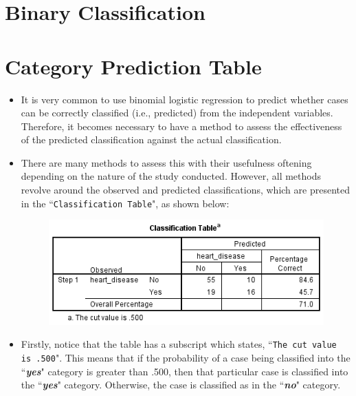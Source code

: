 \documentclass[a4paper,12pt]{article}
\begin{document}
	
\section*{Binary Classification}	





\section*{Category Prediction Table}

\begin{itemize}
	\item It is very common to use binomial logistic regression to predict whether cases can be correctly classified (i.e., predicted) from the independent variables. Therefore, it becomes necessary to have a method to assess the effectiveness of the predicted classification against the actual classification.
	\item  There are many methods to assess this with their usefulness oftening depending on the nature of the study conducted. However, all methods revolve around the observed and predicted classifications, which are presented in the ``\texttt{Classification Table}", as shown below:
	
	
	\begin{figure}[h!]
		\centering
		\includegraphics[width=0.8\linewidth]{images/BLogReg-Table}
	\end{figure}
	
	
	
	\item Firstly, notice that the table has a subscript which states, ``\texttt{The cut value is .500}". This means that if the probability of a case being classified into the ``\textbf{\textit{yes}}" category is greater than .500, then that particular case is classified into the ``\textbf{\textit{yes}}" category. 
	Otherwise, the case is classified as in the ``\textbf{\textit{no}}" category. 
\end{itemize}
\end{document}
